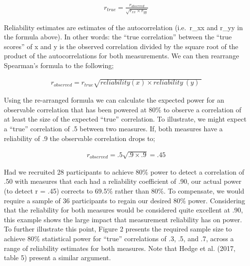 \documentclass[english,,man,floatsintext]{apa6}
\begin{document}
\begin{align}
r_{true}=\frac{r_{observed}}{\sqrt{r_{xx} \times r_{yy}}}
\end{align}

Reliability estimates are estimates of the autocorrelation (i.e.~r\_xx and r\_yy in the formula above). In other words: the \enquote{true correlation} between the \enquote{true scores} of x and y is the observed correlation divided by the square root of the product of the autocorrelations for both measurements. We can then rearrange Spearman's formula to the following;

\begin{align}
r_{observed}=r_{true} \sqrt{reliability(x) \times reliability ~(y) ~}
\end{align}

Using the re-arranged formula we can calculate the expected power for an observable correlation that has been powered at 80\% to observe a correlation of at least the size of the expected \enquote{true} correlation. To illustrate, we might expect a \enquote{true} correlation of .5 between two measures. If, both measures have a reliability of .9 the observable correlation drops to;

\begin{align}
r_{observed}=.5 \sqrt{.9 \times .9}=.45
\end{align}

Had we recruited 28 participants to achieve 80\% power to detect a correlation of .50 with measures that each had a reliability coefficient of .90, our actual power (to detect r = .45) corrects to 69.5\% rather than 80\%. To compensate, we would require a sample of 36 participants to regain our desired 80\% power. Considering that the reliability for both measures would be considered quite excellent at .90, this example shows the large impact that measurement reliability has on power. To further illustrate this point, Figure 2 presents the required sample size to achieve 80\% statistical power for \enquote{true} correlations of .3, .5, and .7, across a range of reliability estimates for both measures. Note that Hedge et al. (2017, table 5) present a similar argument.
\end{document}

